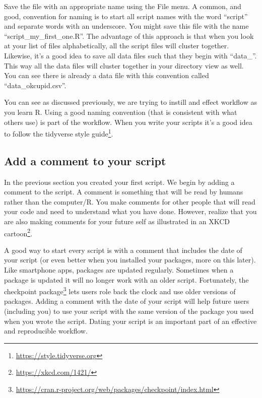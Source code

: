 \documentclass[
]{krantz}
\renewcommand{\href}[2]{#2\footnote{\url{#1}}}
\begin{document}
Save the file with an appropriate name using the File menu. A common, and good, convention for naming is to start all script names with the word ``script'' and separate words with an underscore. You might save this file with the name ``script\_my\_first\_one.R''. The advantage of this approach is that when you look at your list of files alphabetically, all the script files will cluster together. Likewise, it's a good idea to save all data files such that they begin with ``data\_''. This way all the data files will cluster together in your directory view as well. You can see there is already a data file with this convention called ``data\_okcupid.csv''.

You can see as discussed previously, we are trying to instill and effect workflow as you learn R. Using a good naming convention (that is consistent with what others use) is part of the workflow. When you write your scripts it's a good idea to follow the \href{https://style.tidyverse.org}{tidyverse style guide}.

\hypertarget{add-a-comment-to-your-script}{%
\subsection{Add a comment to your script}\label{add-a-comment-to-your-script}}

In the previous section you created your first script. We begin by adding a comment to the script. A comment is something that will be read by humans rather than the computer/R. You make comments for other people that will read your code and need to understand what you have done. However, realize that you are also making comments for your future self as illustrated in an \href{https://xkcd.com/1421/}{XKCD cartoon}.

A good way to start every script is with a comment that includes the date of your script (or even better when you installed your packages, more on this later). Like smartphone apps, packages are updated regularly. Sometimes when a package is updated it will no longer work with an older script. Fortunately, the \href{https://cran.r-project.org/web/packages/checkpoint/index.html}{checkpoint package} lets users role back the clock and use older versions of packages. Adding a comment with the date of your script will help future users (including you) to use your script with the same version of the package you used when you wrote the script. Dating your script is an important part of an effective and reproducible workflow.
\end{document}
